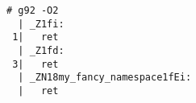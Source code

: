 \begin{lstlisting}[language={},numbers=none,title=\href{https://godbolt.org/z/jWY14x}{\texttt{godbolt.org/z/jWY14x}}]
# g92 -O2
  | _Z1fi:
 1|   ret
  | _Z1fd:
 3|   ret
  | _ZN18my_fancy_namespace1fEi:
  |   ret
\end{lstlisting}
